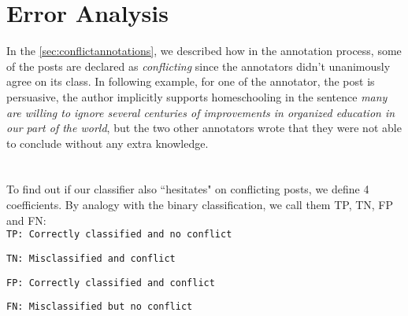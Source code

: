\section{Error Analysis}
In the \cref{sec:conflictannotations}, we described how in the annotation process, some of the posts are declared as \emph{conflicting} since the annotators didn't unanimously agree on its class. In following example, for one of the annotator, the post is persuasive, the author implicitly supports homeschooling in the sentence \emph{many are willing to ignore several centuries of improvements in organized education in our part of the world}, but the two other annotators wrote that they were not able to conclude without any extra knowledge.
\\
\\
\\

To find out if our classifier also ``hesitates" on conflicting posts, we define 4 coefficients. By analogy with the binary classification, we call them TP, TN, FP and FN:
\\

\texttt{TP: Correctly classified and no conflict}

\texttt{TN: Misclassified and conflict }

\texttt{FP: Correctly classified and conflict}

\texttt{FN: Misclassified but no conflict}  
\\

